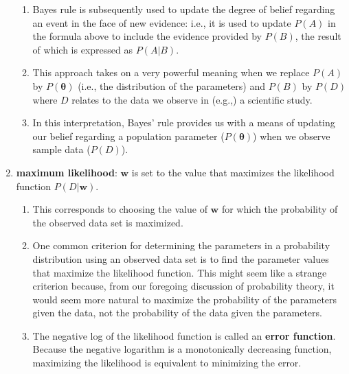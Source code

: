 \begin{enumerate}
\begin{enumerate}
        \item  Bayes rule is subsequently used to update the degree of belief regarding an event in the face of new evidence: i.e., it is used to update $P(A)$ in the formula above to include the evidence provided by $P(B)$, the result of which is expressed as $P(A|B)$.
        \hfill \cite{statistics/book/Statistics-for-Data-Scientists/Maurits-Kaptein}

        \item This approach takes on a very powerful meaning when we replace $P(A)$ by $P(\bm{\theta})$ (i.e., the distribution of the parameters) and $P(B)$ by $P(D)$ where $D$ relates to the data we observe in (e.g.,) a scientific study. 
        
        \item In this interpretation, Bayes’ rule provides us with a means of updating our belief regarding a population parameter ($P(\bm{\theta})$) when we observe sample data ($P(D)$). 
    \end{enumerate}


    \item \textbf{maximum likelihood}: $\bm{w}$ is set to the value that maximizes the likelihood function $P(D|\bm{w})$.
    \begin{enumerate}
        \item This corresponds to choosing the value of $\bm{w}$ for which the probability of the observed data set is maximized.
        \hfill \cite{ml/book/Pattern-Recognition-And-Machine-Learning/Christopher-M-Bishop}

        \item One common criterion for determining the parameters in a probability distribution using an observed data set is to find the parameter values that maximize the likelihood function.
        This might seem like a strange criterion because, from our foregoing discussion of probability theory, it would seem more natural to maximize the probability of the parameters given the data, not the probability of the data given the parameters.
        \hfill \cite{ml/book/Pattern-Recognition-And-Machine-Learning/Christopher-M-Bishop}

        \item The negative log of the likelihood function is called an \textbf{error function}.
        Because the negative logarithm is a monotonically decreasing function, maximizing the likelihood is equivalent to minimizing the error.
        \hfill \cite{ml/book/Pattern-Recognition-And-Machine-Learning/Christopher-M-Bishop}
    \end{enumerate}


\end{enumerate}
